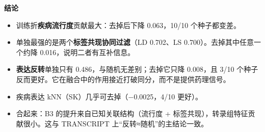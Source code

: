 \documentclass[
  10pt,
]{ctexart}
\providecommand{\tightlist}{%
  \setlength{\itemsep}{0pt}\setlength{\parskip}{0pt}}
\begin{document}
\textbf{结论}

\begin{itemize}
\tightlist
\item
  训练折\textbf{疾病流行度}贡献最大：去掉后下降 0.063，10/10
  个种子都变差。
\item
  单独最强的是两个\textbf{标签共现协同过滤}（LD 0.702、LS
  0.700）。去掉其中任意一个约降 0.016，说明二者有互补信息。
\item
  \textbf{表达反转}单独只有 0.486，与随机无差别；去掉它只降 0.008，且
  3/10
  个种子反而更好。它在融合中的作用接近打破同分，而不是提供药理信号。
\item
  疾病表达 kNN（SK）几乎可去掉（−0.0025，4/10 更好）。
\item
  合起来：B3 的提升来自已知关联结构（流行度 +
  标签共现），转录组特征贡献很小。这与 TRANSCRIPT
  上``反转≈随机''的主结论一致。
\end{itemize}
\end{document}
